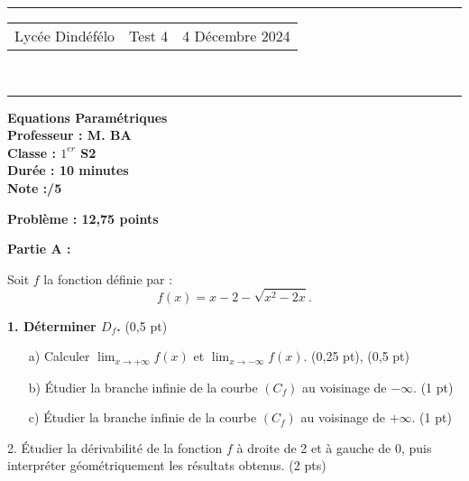 \documentclass[a4paper,12pt]{article}
\begin{document}
\hrule %
\begin{center}
    \begin{tabular}{@{} p{5cm} p{5cm} p{5cm} @{}} %
        Lycée Dindéfélo & \quad\quad\quad Test 4 & 4 Décembre 2024 \\
    \end{tabular}
    \\[-0.01cm] %
    \hrule %
\end{center}
\begin{center}
    \textbf{\Large Equations Paramétriques} \\[0.2cm]
    \textbf{\large Professeur : M. BA} \\[0.2cm]
    \textbf{Classe : $1^{er}$ S2} \\[0.2cm]
    \textbf{\small Durée : 10 minutes} \\[0.2cm]
    \textbf{\small Note :\quad\quad /5}
\end{center}

\textbf{Problème : 12,75 points}

\textbf{Partie A :}

Soit \( f \) la fonction définie par :
\[
f(x) = x - 2 - \sqrt{x^2 - 2x}.
\]


\textbf{1. Déterminer \( D_f \).} \hspace{1cm} (0,5 pt)

\begin{enumerate}
    \item[a)] Calculer \( \lim_{x \to +\infty} f(x) \) et \( \lim_{x \to -\infty} f(x) \). \hspace{1cm} (0,25 pt), (0,5 pt)
    \item[b)] Étudier la branche infinie de la courbe \( (C_f) \) au voisinage de \( -\infty \). \hspace{1cm} (1 pt)
    \item[c)] Étudier la branche infinie de la courbe \( (C_f) \) au voisinage de \( +\infty \). \hspace{1cm} (1 pt)
\end{enumerate}

2. Étudier la dérivabilité de la fonction \( f \) à droite de 2 et à gauche de 0, puis interpréter géométriquement les résultats obtenus. \hspace{1cm} (2 pts)
\end{document}
